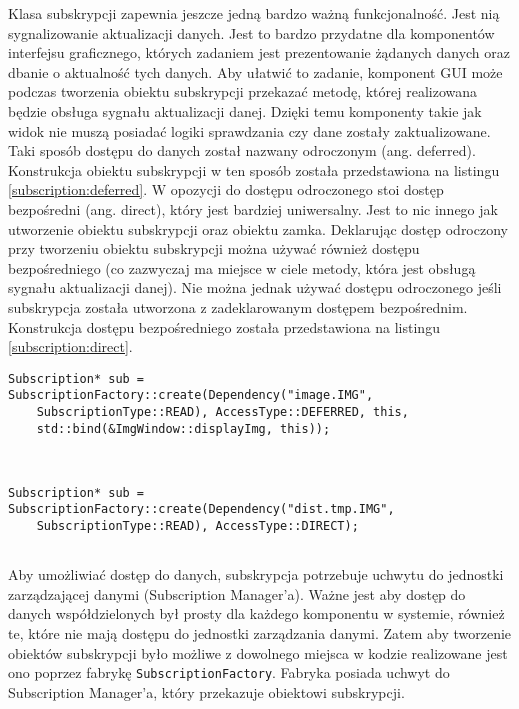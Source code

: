 Klasa subskrypcji zapewnia jeszcze jedną bardzo ważną funkcjonalność. Jest nią sygnalizowanie aktualizacji danych. Jest to bardzo przydatne dla komponentów interfejsu graficznego, których zadaniem jest prezentowanie żądanych danych oraz dbanie o aktualność tych danych. Aby ułatwić to zadanie, komponent GUI może podczas tworzenia obiektu subskrypcji przekazać metodę, której realizowana będzie obsługa sygnału aktualizacji danej. Dzięki temu komponenty takie jak widok nie muszą posiadać logiki sprawdzania czy dane zostały zaktualizowane. Taki sposób dostępu do danych został nazwany odroczonym (ang. deferred). Konstrukcja obiektu subskrypcji w ten sposób została przedstawiona na listingu \ref{subscription:deferred}. W opozycji do dostępu odroczonego stoi dostęp bezpośredni (ang. direct), który jest bardziej uniwersalny. Jest to nic innego jak utworzenie obiektu subskrypcji oraz obiektu zamka. Deklarując dostęp odroczony przy tworzeniu obiektu subskrypcji można używać również dostępu bezpośredniego (co zazwyczaj ma miejsce w ciele metody, która jest obsługą sygnału aktualizacji danej). Nie można jednak używać dostępu odroczonego jeśli subskrypcja została utworzona z zadeklarowanym dostępem bezpośrednim. Konstrukcja dostępu bezpośredniego została przedstawiona na listingu \ref{subscription:direct}.

\begin{minipage}{\textwidth}
	\begin{lstlisting}[label=subscription:deferred, caption={Przykład tworzenia obiektu subskrypcji z odroczonym dostępem do danych },alsoletter={()[].=}]	
Subscription* sub = SubscriptionFactory::create(Dependency("image.IMG",
	SubscriptionType::READ), AccessType::DEFERRED, this,
	std::bind(&ImgWindow::displayImg, this));
	
	
	\end{lstlisting}
\end{minipage}

\begin{minipage}{\textwidth}
	\begin{lstlisting}[label=subscription:direct, caption={Przykład tworzenia obiektu subskrypcji z bezpośrednim dostępem do danych },alsoletter={()[].=}]
Subscription* sub = SubscriptionFactory::create(Dependency("dist.tmp.IMG",
	SubscriptionType::READ), AccessType::DIRECT);
	
	\end{lstlisting}
\end{minipage}

Aby umożliwiać dostęp do danych, subskrypcja potrzebuje uchwytu do jednostki zarządzającej danymi (Subscription Manager'a). Ważne jest aby dostęp do danych współdzielonych był prosty dla każdego komponentu w systemie, również te, które nie mają dostępu do jednostki zarządzania danymi. Zatem aby tworzenie obiektów subskrypcji było możliwe z dowolnego miejsca w kodzie realizowane jest ono poprzez fabrykę \lstinline$SubscriptionFactory$. Fabryka posiada uchwyt do Subscription Manager'a, który przekazuje obiektowi subskrypcji. 

